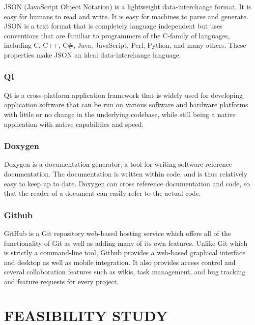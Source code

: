 \documentclass[12pt]{report}
\let\Oldsubsection\subsection
\renewcommand{\subsection}{\FloatBarrier\Oldsubsection}
\begin{document}
JSON (JavaScript Object Notation) is a lightweight data-interchange format. It is easy for humans to read and write. It is easy for machines to parse and generate. JSON is a text format that is completely language independent but uses conventions that are familiar to programmers of the C-family of languages, including C, C++, C\#, Java, JavaScript, Perl, Python, and many others. These properties make JSON an ideal data-interchange language.

\subsection{Qt}

Qt is a cross-platform application framework that is widely used for developing application software that can be run on various software and hardware platforms with little or no change in the underlying codebase, while still being a native application with native capabilities and speed. 

\subsection{Doxygen}
Doxygen is a documentation generator, a tool for writing software reference 
documentation. The documentation is written within code, and is thus 
relatively easy to keep up to date. Doxygen can cross reference 
documentation and code, so that the reader of a document can easily 
refer to the actual code.


\subsection{Github}
GitHub is a Git repository web-based hosting service which offers all of the functionality of Git as well as adding many of its own features. Unlike Git which is strictly a command-line tool, Github provides a web-based graphical interface and desktop as well as mobile integration. It also provides access control and several collaboration features such as wikis, task management, and bug tracking and feature requests for every project.


\chapter{FEASIBILITY STUDY}
\end{document}
